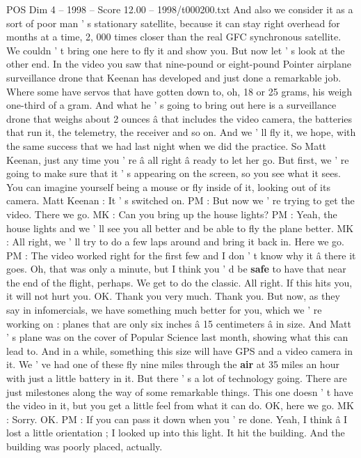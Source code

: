 \begin{textsample}{POS Dim 4 – 1998 – Score 12.00 – 1998/t000200.txt}
And also we consider it as a sort of poor man ' s stationary satellite, because it can stay right overhead for months at a time, 2, 000 times closer than the real GFC synchronous satellite.
We couldn ' t bring one here to fly it and show you.
But now let ' s look at the other end.
In the video you saw that nine-pound or eight-pound Pointer airplane surveillance drone that Keenan has developed and just done a remarkable job.
Where some have servos that have gotten down to, oh, 18 or 25 grams, his weigh one-third of a gram.
And what he ' s going to bring out here is a surveillance drone that weighs about 2 ounces â that includes the video camera, the batteries that run it, the telemetry, the receiver and so on.
And we ' ll fly it, we hope, with the same success that we had last night when we did the practice.
So Matt Keenan, just any time you ' re â all right â ready to let her go.
But first, we ' re going to make sure that it ' s appearing on the screen, so you see what it sees.
You can imagine yourself being a mouse or fly inside of it, looking out of its camera.
Matt Keenan : It ' s switched on.
PM : But now we ' re trying to get the video.
There we go.
MK : Can you bring up the house lights?
PM : Yeah, the house lights and we ' ll see you all better and be able to fly the plane better.
MK : All right, we ' ll try to do a few laps around and bring it back in.
Here we go.
PM : The video worked right for the first few and I don ' t know why it â there it goes.
Oh, that was only a minute, but I think you ' d be \textbf{safe} to have that near the end of the flight, perhaps.
We get to do the classic.
All right.
If this hits you, it will not hurt you.
OK.
Thank you very much.
Thank you.
But now, as they say in infomercials, we have something much better for you, which we ' re working on : planes that are only six inches â 15 centimeters â in size.
And Matt ' s plane was on the cover of Popular Science last month, showing what this can lead to.
And in a while, something this size will have GPS and a video camera in it.
We ' ve had one of these fly nine miles through the \textbf{air} at 35 miles an hour with just a little battery in it.
But there ' s a lot of technology going.
There are just milestones along the way of some remarkable things.
This one doesn ' t have the video in it, but you get a little feel from what it can do.
OK, here we go.
MK : Sorry.
OK.
PM : If you can pass it down when you ' re done.
Yeah, I think â I lost a little orientation ; I looked up into this light.
It hit the building.
And the building was poorly placed, actually.

\end{textsample}
